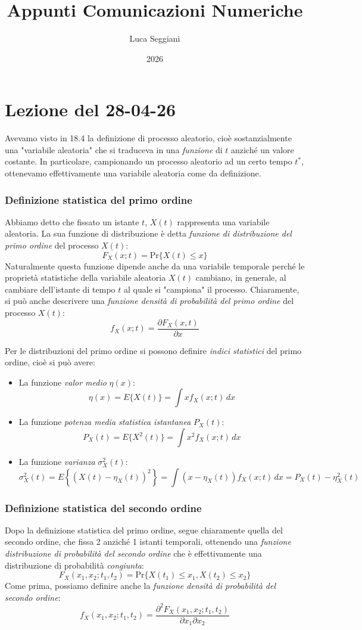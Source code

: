 \documentclass[a4paper,11pt]{article}
\title{Appunti Comunicazioni Numeriche}
\author{Luca Seggiani}
\date{2026}
\begin{document}
\section{Lezione del 28-04-26}

\thispagestyle{empty}
\pagestyle{fancy}

Avevamo visto in 18.4 la definizione di processo aleatorio, cioè sostanzialmente una "variabile aleatoria" che si traduceva in una \textit{funzione} di $t$ anziché un valore costante. In particolare, campionando un processo aleatorio ad un certo tempo $t^*$, ottenevamo effettivamente una variabile aleatoria come da definizione.

\subsubsection{Definizione statistica del primo ordine}
Abbiamo detto che fissato un istante $t$, $X(t)$ rappresenta una variabile aleatoria. La sua funzione di distribuzione è detta \textit{funzione di distribuzione del primo ordine} del processo $X(t)$:
$$
F_X(x; t) = \mathrm{Pr}\{X(t) \leq x\}
$$
Naturalmente questa funzione dipende anche da una variabile temporale perché le proprietà statistiche della variabile aleatoria $X(t)$ cambiano, in generale, al cambiare dell’istante di tempo $t$ al quale si "campiona" il processo. Chiaramente, si può anche descrivere una \textit{funzione densità di probabilità del primo ordine} del processo $X(t)$:
$$
f_X(x; t) = \frac{\partial F_X(x, t)}{\partial x}
$$

Per le distribuzioni del primo ordine si possono definire \textit{indici statistici} del primo ordine, cioè si può avere:
\begin{itemize}
\item La funzione \textit{valor medio} $\eta(x)$:
$$
\eta(x) = E\{X(t)\} = \int x f_X(x;t) \, dx
$$
\item La funzione \textit{potenza media statistica istantanea} $P_X(t)$:
$$
P_X(t) = E\{X^2(t)\} = \int x^2 f_X(x;t) \, dx
$$
\item La funzione \textit{varianza} $\sigma^2_X(t)$:
$$
\sigma^2_X(t) = E\left\{ (X(t) - \eta_X(t))^2 \right\} = \int (x - \eta_X(t)) f_X(x;t) \, dx = P_X(t) - \eta^2_X(t)
$$
\end{itemize}

\subsubsection{Definizione statistica del secondo ordine}
Dopo la definizione statistica del primo ordine, segue chiaramente quella del secondo ordine, che fissa 2 anziché 1 istanti temporali, ottenendo una \textit{funzione distribuzione di probabilità del secondo ordine} che è effettivamente una distribuzione di probabilità \textit{congiunta}:
$$
F_X(x_1, x_2; t_1, t_2) = \mathrm{Pr} \{X(t_1) \leq x_1, X(t_2) \leq x_2\}
$$
Come prima, possiamo definire anche la \textit{funzione densità di probabilità del secondo ordine}:
$$
f_X(x_1, x_2; t_1, t_2) = \frac{\partial^2 F_X(x_1, x_2; t_1, t_2)}{\partial x_1 \partial x_2}
$$
\end{document}
